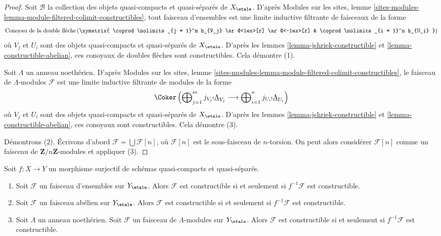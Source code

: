 \begin{proof}
Soit $\mathcal{B}$ la collection des objets quasi-compacts et quasi-s\'epar\'es
de $X_\etale$. D'apr\`es Modules sur les sites,
lemme \ref{sites-modules-lemma-module-filtered-colimit-constructibles},
tout faisceau d'ensembles est une limite inductive filtrante de faisceaux de la forme
$$
\text{Conoyau de la double fl\`eche}\left(
\xymatrix{
\coprod\nolimits_{j = 1}^m h_{V_j}
\ar@<1ex>[r] \ar@<-1ex>[r] &
\coprod\nolimits_{i = 1}^n h_{U_i}
}
\right)
$$
o\`u $V_j$ et $U_i$ sont des objets quasi-compacts et quasi-s\'epar\'es
de $X_\etale$. D'apr\`es les
lemmes \ref{lemma-jshriek-constructible} et \ref{lemma-constructible-abelian},
ces conoyaux de doubles fl\`eches sont constructibles. Cela d\'emontre (1).

\medskip\noindent
Soit $\Lambda$ un anneau noeth\'erien.
D'apr\`es Modules sur les sites,
lemme \ref{sites-modules-lemma-module-filtered-colimit-constructibles},
le faisceau de $\Lambda$-modules $\mathcal{F}$ est une limite inductive filtrante
de modules de la forme
$$
\Coker\left(
\bigoplus\nolimits_{j = 1}^m j_{V_j!}\underline{\Lambda}_{V_j}
\longrightarrow
\bigoplus\nolimits_{i = 1}^n j_{U_i!}\underline{\Lambda}_{U_i}
\right)
$$
o\`u $V_j$ et $U_i$ sont des objets quasi-compacts et quasi-s\'epar\'es
de $X_\etale$. D'apr\`es les
lemmes \ref{lemma-jshriek-constructible} et \ref{lemma-constructible-abelian},
ces conoyaux sont constructibles. Cela d\'emontre (3).

\medskip\noindent
D\'emontrons (2). \'Ecrivons d'abord $\mathcal{F} = \bigcup \mathcal{F}[n]$, o\`u
$\mathcal{F}[n]$ est le sous-faisceau de $n$-torsion. On peut alors consid\'erer
$\mathcal{F}[n]$ comme un faisceau de $\mathbf{Z}/n\mathbf{Z}$-modules
et appliquer (3).
\end{proof}

\begin{lemma}
\label{lemma-check-constructible}
Soit $f : X \to Y$ un morphisme surjectif de sch\'emas quasi-compacts et
quasi-s\'epar\'es.
\begin{enumerate}
\item Soit $\mathcal{F}$ un faisceau d'ensembles sur $Y_\etale$. Alors $\mathcal{F}$
est constructible si et seulement si $f^{-1}\mathcal{F}$ est constructible.
\item Soit $\mathcal{F}$ un faisceau ab\'elien sur $Y_\etale$. Alors $\mathcal{F}$
est constructible si et seulement si $f^{-1}\mathcal{F}$ est constructible.
\item Soit $\Lambda$ un anneau noeth\'erien.
Soit $\mathcal{F}$ un faisceau de $\Lambda$-modules sur $Y_\etale$.
Alors $\mathcal{F}$ est constructible si et seulement si $f^{-1}\mathcal{F}$
est constructible.
\end{enumerate}
\end{lemma}

